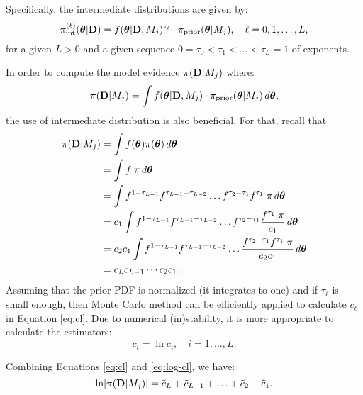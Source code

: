Specifically, the intermediate distributions are given by:
\begin{equation}
\label{eq:intermediate_dist}
\pi_\text{int}^{(\ell)} (\mbox{\boldmath$ \theta $}|{\bf D}) = f(\mbox{\boldmath$ \theta $}|{\bf D}, M_j)^{\tau_\ell} \cdot \pi_{\text{prior}} (\mbox{\boldmath$ \theta $} | M_j), \quad \ell=0,1,\ldots,L,
\end{equation}
for a given $L > 0$ and a given sequence $0 = \tau_0 < \tau_1 < \ldots < \tau_L = 1$
of exponents.


 

In order to compute the model evidence $\pi( {\bf D} |M_j)$ where:
\begin{equation}
 \label{eq:evidence}
 \pi( {\bf D} |M_j)=\int f(\mbox{\boldmath$ \theta $}|{\bf D}, M_j) \cdot \pi_{\text{prior}} (\mbox{\boldmath$ \theta $}|M_j) \, d\mbox{\boldmath$ \theta $}, 
\end{equation}
the use of intermediate distribution is also beneficial.
For that, recall that
\begin{equation}
\label{eq:cl}
\begin{split}
 \pi( {\bf D} |M_j) &= \int f(\mbox{\boldmath$ \theta $})\pi (\mbox{\boldmath$ \theta $}) \, d\mbox{\boldmath$ \theta $} \\
  &= \int f \; \pi \, d\mbox{\boldmath$ \theta $} \\
  &= \int f^{1-\tau_{L-1}} f^{\tau_{L-1}-\tau_{L-2}}\ldots f^{\tau_2-\tau_1} f^{\tau_1}\; \pi \, d\mbox{\boldmath$ \theta $} \\
  &= c_1 \int f^{1-\tau_{L-1}} f^{\tau_{L-1}-\tau_{L-2}}\ldots f^{\tau_2-\tau_1} \dfrac{f^{\tau_1}\; \pi}{c_1} \, d\mbox{\boldmath$ \theta $} \\
  &= c_2 c_1 \int f^{1-\tau_{L-1}} f^{\tau_{L-1}-\tau_{L-2}}\ldots  \dfrac{f^{\tau_2-\tau_1} f^{\tau_1}\; \pi}{c_2 c_1} \, d\mbox{\boldmath$ \theta $} \\
  &= c_L c_{L-1} \cdots c_2 c_1.
\end{split}
\end{equation}
Assuming that the prior PDF is normalized (it integrates to one) and if
$\tau_{\ell}$ is small enough, then Monte Carlo method can be efficiently
applied to calculate $c_{\ell}$ in Equation \eqref{eq:cl}. Due to numerical
(in)stability, it is more appropriate to calculate the estimators:
\begin{equation}
 \label{eq:log-cl}
 \tilde{c_i} = \ln c_i, \quad i=1,\ldots, L.
\end{equation}

Combining Equations \eqref{eq:cl} and \eqref{eq:log-cl}, we have:
\begin{equation*}
 \ln[\pi( {\bf D} |M_j)] = \tilde{c}_{L}+\tilde{c}_{L-1}+\ldots+\tilde{c}_2+\tilde{c}_1.
\end{equation*}


